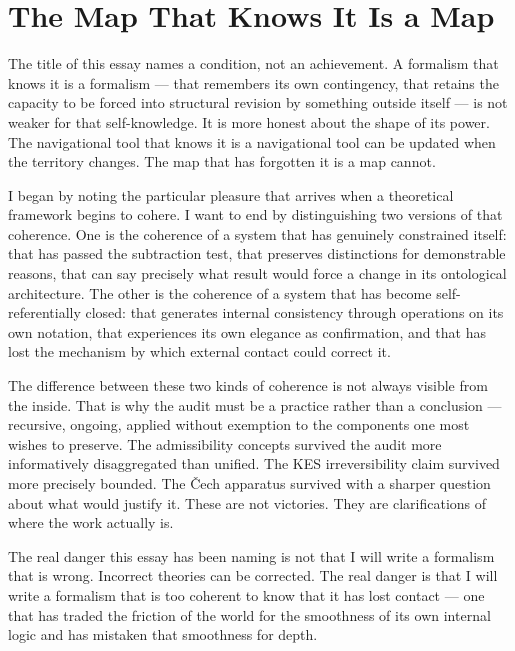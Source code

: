 \documentclass[12pt, a4paper]{article}
\begin{document}
\section{The Map That Knows It Is a Map}

The title of this essay names a condition, not an achievement. A formalism that knows it is a formalism --- that remembers its own contingency, that retains the capacity to be forced into structural revision by something outside itself --- is not weaker for that self-knowledge. It is more honest about the shape of its power. The navigational tool that knows it is a navigational tool can be updated when the territory changes. The map that has forgotten it is a map cannot.

I began by noting the particular pleasure that arrives when a theoretical framework begins to cohere. I want to end by distinguishing two versions of that coherence. One is the coherence of a system that has genuinely constrained itself: that has passed the subtraction test, that preserves distinctions for demonstrable reasons, that can say precisely what result would force a change in its ontological architecture. The other is the coherence of a system that has become self-referentially closed: that generates internal consistency through operations on its own notation, that experiences its own elegance as confirmation, and that has lost the mechanism by which external contact could correct it.

The difference between these two kinds of coherence is not always visible from the inside. That is why the audit must be a practice rather than a conclusion --- recursive, ongoing, applied without exemption to the components one most wishes to preserve. The admissibility concepts survived the audit more informatively disaggregated than unified. The KES irreversibility claim survived more precisely bounded. The \v{C}ech apparatus survived with a sharper question about what would justify it. These are not victories. They are clarifications of where the work actually is.

The real danger this essay has been naming is not that I will write a formalism that is wrong. Incorrect theories can be corrected. The real danger is that I will write a formalism that is too coherent to know that it has lost contact --- one that has traded the friction of the world for the smoothness of its own internal logic and has mistaken that smoothness for depth.
\end{document}
